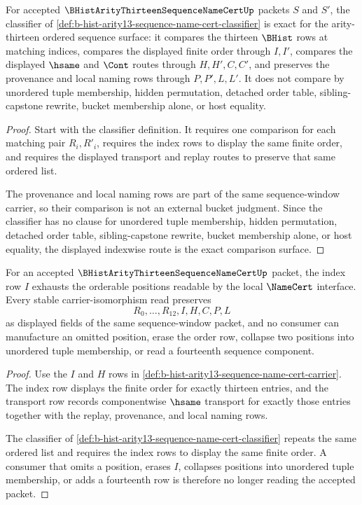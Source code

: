 \begin{theorem}
\label{thm:b-hist-arity13-sequence-name-cert-classifier-exactness}
For accepted $\BHistArityThirteenSequenceNameCertUp$ packets $S$ and $S'$, the classifier of \autoref{def:b-hist-arity13-sequence-name-cert-classifier} is exact for the arity-thirteen ordered sequence surface: it compares the thirteen $\BHist$ rows at matching indices, compares the displayed finite order through $I,I'$, compares the displayed $\hsame$ and $\Cont$ routes through $H,H',C,C'$, and preserves the provenance and local naming rows through $P,P',L,L'$. It does not compare by unordered tuple membership, hidden permutation, detached order table, sibling-capstone rewrite, bucket membership alone, or host equality.
\end{theorem}
\begin{proof}
Start with the classifier definition. It requires one comparison for each matching pair $R_i,R'_i$, requires the index rows to display the same finite order, and requires the displayed transport and replay routes to preserve that same ordered list.

The provenance and local naming rows are part of the same sequence-window carrier, so their comparison is not an external bucket judgment. Since the classifier has no clause for unordered tuple membership, hidden permutation, detached order table, sibling-capstone rewrite, bucket membership alone, or host equality, the displayed indexwise route is the exact comparison surface.
\end{proof}

\begin{theorem}
\label{thm:b-hist-arity13-sequence-name-cert-index-exhaustion}
For an accepted $\BHistArityThirteenSequenceNameCertUp$ packet, the index row $I$ exhausts the orderable positions readable by the local $\NameCert$ interface. Every stable carrier-isomorphism read preserves
$$
R_0,\ldots,R_{12},I,H,C,P,L
$$
as displayed fields of the same sequence-window packet, and no consumer can manufacture an omitted position, erase the order row, collapse two positions into unordered tuple membership, or read a fourteenth sequence component.
\end{theorem}
\begin{proof}
Use the $I$ and $H$ rows in \autoref{def:b-hist-arity13-sequence-name-cert-carrier}. The index row displays the finite order for exactly thirteen entries, and the transport row records componentwise $\hsame$ transport for exactly those entries together with the replay, provenance, and local naming rows.

The classifier of \autoref{def:b-hist-arity13-sequence-name-cert-classifier} repeats the same ordered list and requires the index rows to display the same finite order. A consumer that omits a position, erases $I$, collapses positions into unordered tuple membership, or adds a fourteenth row is therefore no longer reading the accepted packet.
\end{proof}

